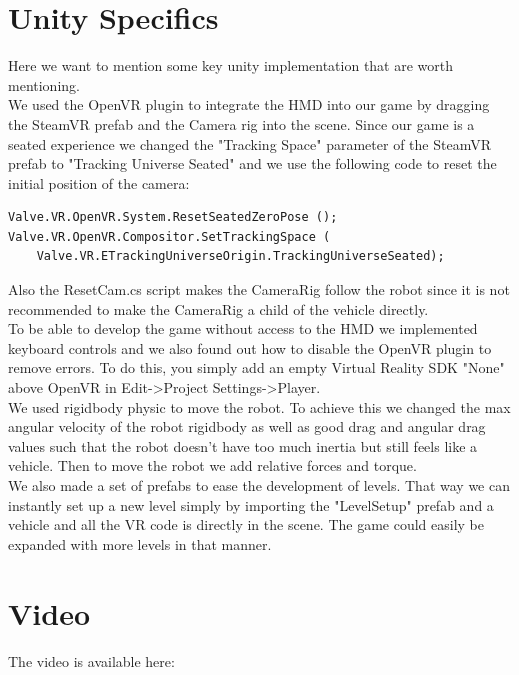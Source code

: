 \documentclass[12pt]{article}
\begin{document}
\section{Unity Specifics}
Here we want to mention some key unity implementation that are worth mentioning. \\

We used the OpenVR plugin to integrate the HMD into our game by dragging the SteamVR prefab and the Camera rig into the scene. Since our game is a seated experience we changed the "Tracking Space" parameter of the SteamVR prefab to "Tracking Universe Seated" and we use the following code to reset the initial position of the camera: \\

\begin{lstlisting}
Valve.VR.OpenVR.System.ResetSeatedZeroPose ();
Valve.VR.OpenVR.Compositor.SetTrackingSpace (
    Valve.VR.ETrackingUniverseOrigin.TrackingUniverseSeated);
\end{lstlisting}

Also the ResetCam.cs script makes the CameraRig follow the robot since it is not recommended to make the CameraRig a child of the vehicle directly. \\

To be able to develop the game without access to the HMD we implemented keyboard controls and we also found out how to disable the OpenVR plugin to remove errors. To do this, you simply add an empty Virtual Reality SDK "None" above OpenVR in Edit->Project Settings->Player. \\ 

We used rigidbody physic to move the robot. To achieve this we changed the max angular velocity of the robot rigidbody as well as good drag and angular drag values such that the robot doesn't have too much inertia but still feels like a vehicle. Then to move the robot we add relative forces and torque. \\

We also made a set of prefabs to ease the development of levels. That way we can instantly set up a new level simply by importing the "LevelSetup" prefab and a vehicle and all the VR code is directly in the scene. The game could easily be expanded with more levels in that manner. \\




\section{Video}
The video is available here: 
\end{document}
